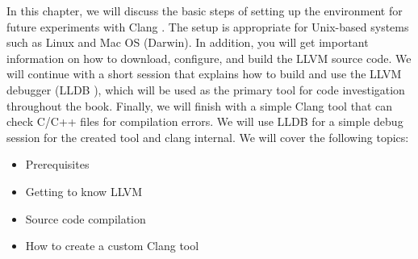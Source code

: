 In this chapter, we will discuss the basic steps of setting up the environment for future experiments with Clang . The setup is appropriate for Unix-based systems such as Linux and Mac OS (Darwin). In addition, you will get important information on how to download, configure, and build the LLVM source code. We will continue with a short session that explains how to build and use the LLVM debugger (LLDB ), which will be used as the primary tool for code investigation throughout the book. Finally, we will finish with a simple Clang tool that can check C/C++ files for compilation errors. We will use LLDB for a simple debug session for the created tool and clang internal. We will cover the following topics:

\begin{itemize}
\item
Prerequisites

\item
Getting to know LLVM

\item
Source code compilation

\item
How to create a custom Clang tool
\end{itemize}